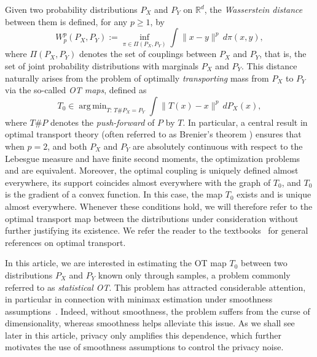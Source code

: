 \documentclass{article}
\newcommand{\R}{\mathbb{R}}
\DeclareMathOperator*{\argmin}{arg\,min}
\newcommand{\1}{\mathds{1}}
\theoremstyle{plain}
\theoremstyle{definition}
\theoremstyle{remark}
\begin{document}
Given two probability distributions $P_X$ and $P_Y$ on $\R^d$, the \emph{Wasserstein distance} between them is defined, for any $p \geq 1$, by
\begin{equation}
\label{eq:wasserstein_distance}
W_p^p(P_X, P_Y)
:=
\inf_{\pi \in \Pi(P_X,P_Y)}
\int\|x-y\|^p \, d\pi(x,y),
\end{equation}
where $\Pi(P_X,P_Y)$ denotes the set of couplings between $P_X$ and $P_Y$, that is, the set of joint probability distributions with marginals $P_X$ and $P_Y$. This distance naturally arises from the problem of optimally \emph{transporting} mass from $P_X$ to $P_Y$ via the so-called \emph{OT maps}, defined as
\begin{equation}
\label{eq:ot_map}
    T_0 \in \argmin_{T:\, T \# P_X = P_Y} \int \| T(x) - x \|^p \, dP_X(x),
\end{equation}
where $T \# P$ denotes the \emph{push-forward} of $P$ by $T$. In particular, a central result in optimal transport theory (often referred to as Brenier's theorem \cite[Sec.~1.3.1]{santambrogio2015optimal}) ensures that when $p=2$, and both $P_X$ and $P_Y$ are absolutely continuous with respect to the Lebesgue measure and have finite second moments, the optimization problems  and  are equivalent. Moreover, the optimal coupling is uniquely defined almost everywhere, its support coincides almost everywhere with the graph of $T_0$, and $T_0$ is the gradient of a convex function. In this case, the map $T_0$ exists and is unique almost everywhere. Whenever these conditions hold, we will therefore refer to the optimal transport map between the distributions under consideration without further justifying its existence. We refer the reader to the textbooks~\cite{villani2009optimal,santambrogio2015optimal} for general references on optimal transport.


In this article, we are interested in estimating the OT map $T_0$ between two distributions $P_X$ and $P_Y$ known only through samples, a problem commonly referred to as \emph{statistical OT}. This problem has attracted considerable attention, in particular in connection with minimax estimation under smoothness assumptions~\cite{chernozhukov2015mongekantorovichdepthquantilesranks,deb2019multivariaterankbaseddistributionfreenonparametric,hutter2021minimax,pooladian2021entropic,muzellec2021nearoptimalestimationsmoothtransport,Gunsilius_2022,Manole2024Plugin,ding2024statisticalconvergenceratesoptimal,balakrishnan2025stabilityboundssmoothoptimal}. Indeed, without smoothness, the problem suffers from the curse of dimensionality, whereas smoothness helps alleviate this issue. As we shall see later in this article, privacy only amplifies this dependence, which further motivates the use of smoothness assumptions to control the privacy noise.
\end{document}
